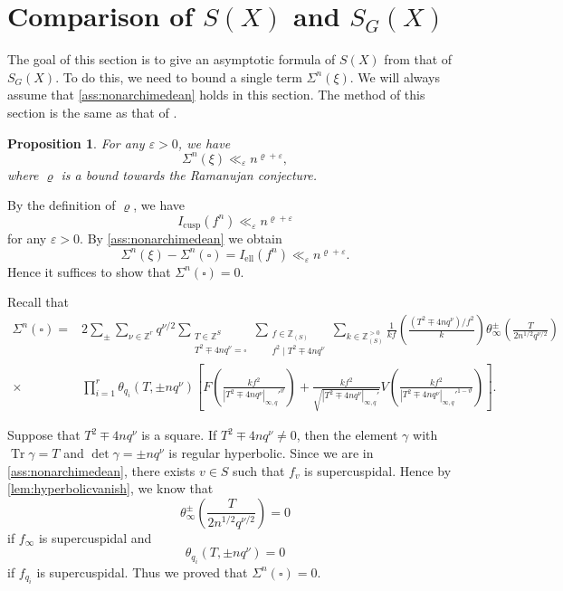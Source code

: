 \documentclass[10pt,oneside,reqno]{amsart}
\makeatletter
\newcommand\ZZ{\mathbb{Z}}
\DeclareMathOperator\Tr{Tr}
\newcommand\el{\mathrm{ell}}
\newcommand\cusp{\mathrm{cusp}}
\newcommand\legendresymbol[2]{\genfrac{(}{)}{}{}{#1}{#2}}
\theoremstyle{THEOREM}
\newtheorem{proposition}[theorem]{Proposition}
\theoremstyle{DEFINITION}
\theoremstyle{EXERCISE}
\numberwithin{equation}{section}
\renewenvironment{proof}[1][\proofname]{\par
  \vspace{-6pt}
  \pushQED{\qed}
  \normalfont \topsep6\p@\@plus6\p@\relax
  \trivlist
  \item[\hskip\labelsep\rmfamily\bfseries
    #1\@addpunct{:}]\ignorespaces
}{
  \popQED\endtrivlist\@endpefalse
  \vspace{-6pt}
}
\makeatother
\begin{document}
\section{Comparison of $S(X)$ and $S_G(X)$}
The goal of this section is to give an asymptotic formula of $S(X)$ from that of $S_G(X)$. To do this, we need to bound a single term $\Sigma^n(\xi)$. We will always assume that \autoref{ass:nonarchimedean} holds in this section. The method of this section is the same as that of \cite[Section 7]{cheng2025c}.
\begin{proposition}\label{prop:ramanujan}
For any $\varepsilon>0$, we have
\[
\Sigma^n(\xi)\ll_\varepsilon n^{\varrho+\varepsilon},
\]
where $\varrho$ is a bound towards the Ramanujan conjecture.
\end{proposition}
\begin{proof}
By the definition of $\varrho$, we have
\[
I_\cusp(f^n)\ll_\varepsilon n^{\varrho+\varepsilon}
\]
for any $\varepsilon>0$. By \autoref{ass:nonarchimedean} we obtain
\[
\Sigma^n(\xi)-\Sigma^n(\square)=I_\el(f^n)\ll_\varepsilon n^{\varrho+\varepsilon}.
\]
Hence it suffices to show that $\Sigma^n(\square)=0$.

Recall that
\begin{align*}
\Sigma^n(\square)=&2\sum_{\pm}\sum_{\nu\in \ZZ^r}q^{\nu/2}\sum_{\substack{T\in \ZZ^S\\ T^2\mp 4nq^\nu= \square}}\sum_{\substack{f\in \ZZ_{(S)}\\ f^2\mid T^2\mp 4nq^\nu}}  \sum_{k\in \ZZ_{(S)}^{>0}}\frac{1}{kf}\legendresymbol{(T^2\mp 4nq^\nu)/f^2}{k}\theta_\infty^\pm\legendresymbol{T}{2n^{1/2}q^{\nu/2}}\\
    \times &\prod_{i=1}^{r}\theta_{q_i}(T,\pm nq^\nu)\left[F\legendresymbol{kf^2}{|T^2\mp 4nq^\nu|_{\infty,q}'^{\vartheta}}+\frac{kf^2}{\sqrt{|T^2\mp 4nq^\nu|_{\infty,q}'}}V\legendresymbol{kf^2}{|T^2\mp 4nq^\nu|_{\infty,q}'^{1-\vartheta}}\right].
\end{align*}

Suppose that $T^2\mp 4nq^\nu$ is a square. If $T^2\mp 4nq^\nu\neq 0$, then the element $\gamma$ with $\Tr\gamma=T$ and $\det\gamma=\pm nq^\nu$ is regular hyperbolic. Since we are in \autoref{ass:nonarchimedean}, there exists $v\in S$ such that $f_v$ is supercuspidal. Hence by \autoref{lem:hyperbolicvanish}, we know that 
\[
\theta_\infty^\pm\legendresymbol{T}{2n^{1/2}q^{\nu/2}}=0
\]
if $f_\infty$ is supercuspidal and
\[
\theta_{q_i}(T,\pm nq^\nu)=0
\]
if $f_{q_i}$ is supercuspidal. Thus we proved that $\Sigma^n(\square)=0$.
\end{proof}
\end{document}
